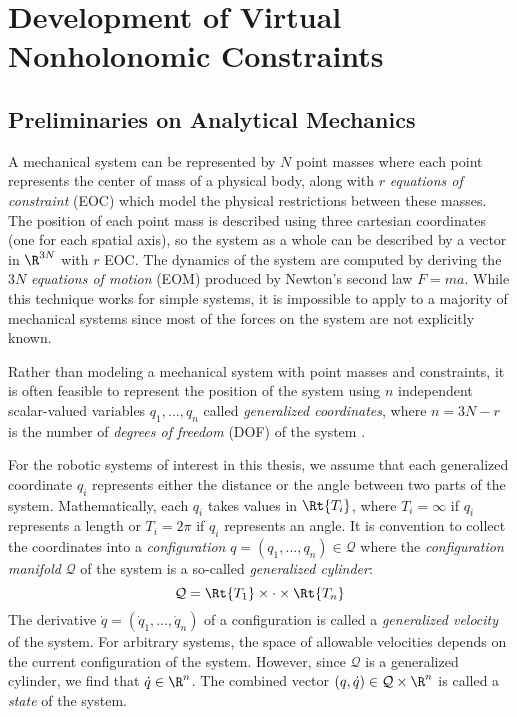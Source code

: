 

\chapter{Development of Virtual Nonholonomic Constraints}

\section{Preliminaries on Analytical Mechanics}
A mechanical system can be represented by \(N\) point masses where each point
represents the center of mass of a physical body, along with \(r\)
\textit{equations of constraint} (EOC) which model the physical restrictions
between these masses.
The position of each point mass is described using three cartesian coordinates (one
for each spatial axis), so the system as a whole can be described by a vector in
\(\R^{3N}\) with \(r\) EOC. 
The dynamics of the system are computed by deriving the \(3N\)
\textit{equations of motion} (EOM) produced by Newton's second law \(F = m a\).
While this technique works for simple systems, it is impossible to
apply to a majority of mechanical systems since most of the forces 
on the system are not explicitly known. 

Rather than modeling a mechanical system with point masses and constraints,
it is often feasible to represent the position of the system using \(n\)
independent scalar-valued variables \(q_1,\ldots,q_n\) called 
\textit{generalized coordinates}, where \(n = 3N - r\) is the number of
\textit{degrees of freedom} (DOF) of the system \cite{greenwood_dynamics}.

For the robotic systems of interest in this thesis, we assume that
each generalized coordinate \(q_i\) represents either the distance or the angle
between two parts of the system.
Mathematically, each \(q_i\) takes values in \(\Rt{T_i}\), where
\(T_i = \infty\) if \(q_i\) represents a length or \(T_i = 2\pi\) if \(q_i\)
represents an angle.
It is convention to collect the coordinates into a \textit{configuration} 
\(q = (q_1,\ldots,q_n) \in \mathcal{Q}\) 
where the \textit{configuration manifold} \(\mathcal{Q}\) of the system is a
so-called \textit{generalized cylinder}:
\[
    \mathcal{Q} = \Rt{T_1} \times \cdot \times \Rt{T_n}
\] 
The derivative \(\dot{q} = (\dot{q}_1,\ldots,\dot{q}_n)\) of a configuration
is called a \textit{generalized velocity} of the system. For arbitrary systems,
the space of allowable velocities depends on the current configuration of the
system.  However, since \(\mathcal{Q}\) is a generalized cylinder, we find that 
\(\dot{q} \in \R^n\).
The combined vector \((q,\dot{q}) \in \mathcal{Q}\times\R^n\) is called a 
\textit{state} of the system.

